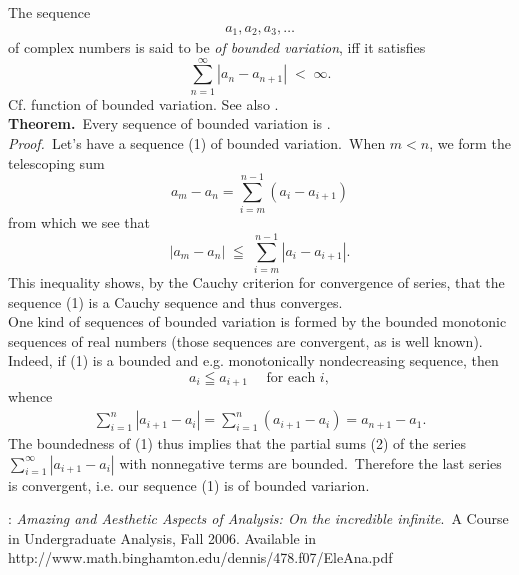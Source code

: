 \documentclass[12pt]{article}
\begin{document}
The sequence 
\begin{align}
a_1, a_2, a_3, \ldots
\end{align}
of complex numbers is said to be {\it of bounded variation}, iff it satisfies 
$$\sum_{n=1}^\infty|a_n\!-\!a_{n+1}| \;<\; \infty.$$
Cf. function of bounded variation. See also 
.\\

\textbf{Theorem.}\, Every sequence of bounded variation is
.\\

{\it Proof.}\, Let's have a sequence (1) of bounded variation.\, 
When $m < n$, we form the telescoping sum
$$a_m-a_n = \sum_{i=m}^{n-1}(a_i-a_{i+1})$$
from which we see that
$$|a_m-a_n| \;\leqq\; \sum_{i=m}^{n-1}|a_i-a_{i+1}|.$$
This inequality shows, by the Cauchy criterion for convergence of 
series, that the sequence (1) is a Cauchy sequence and thus 
converges. \Box\\

One kind of sequences of bounded variation is formed by the 
bounded monotonic sequences of real numbers (those sequences 
are convergent, as is well known).\, Indeed, if (1) is a bounded 
and e.g. monotonically nondecreasing sequence, then 
$$a_i \leqq a_{i+1} \quad\mbox{  for each }i,$$
whence 
\begin{align}
\sum_{i=1}^n|a_{i+1}-a_i| = \sum_{i=1}^n(a_{i+1}-a_i) 
                            = a_{n+1}-a_1.
\end{align}                            
The boundedness of (1) thus implies that the partial sums (2) of 
the series $\sum_{i=1}^\infty|a_{i+1}-a_i|$ with nonnegative 
terms are bounded.\, Therefore the last series is convergent, i.e. 
our sequence (1) is of bounded variarion.

\begin{thebibliography}{8}
: {\it Amazing and Aesthetic
Aspects of Analysis: On the incredible infinite}.\, A Course in Undergraduate Analysis, Fall 2006.\; 
Available in http://www.math.binghamton.edu/dennis/478.f07/EleAna.pdf
\end{thebibliography}
\end{document}
